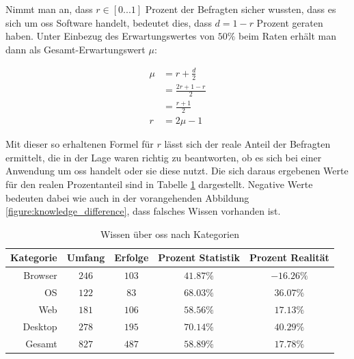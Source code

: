 \documentclass[a4paper]{article}
\begin{document}
                Nimmt man an, dass $r \in \left[0...1\right]$ Prozent der Befragten sicher wussten, dass es sich um \gls{oss} Software handelt, bedeutet dies, dass $d = 1 - r$ Prozent geraten haben. Unter Einbezug des Erwartungswertes von $50 \%$ beim Raten erhält man dann als Gesamt-Erwartungswert $\mu$:
            
                \begin{equation}
                \begin{split}
                    \mu &= r + \frac{d}{2} \\
                        &= \frac{2r + 1 - r}{2} \\
                        &= \frac{r + 1}{2} \\
                    r   &= 2\mu - 1
                \end{split}
                \end{equation}
            
                Mit dieser so erhaltenen Formel für $r$ lässt sich der reale Anteil der Befragten ermittelt, die in der Lage waren richtig zu beantworten, ob es sich bei einer Anwendung um \gls{oss} handelt oder sie diese nutzt. Die sich daraus ergebenen Werte für den realen Prozentanteil sind in Tabelle \ref{table:knowledge_by_category} dargestellt. Negative Werte bedeuten dabei wie auch in der vorangehenden Abbildung \ref{figure:knowledge_difference}, dass falsches Wissen vorhanden ist.
                
                
                \begin{table}
                    \centering
                    \begin{tabular}{rcccc}
                        Kategorie & Umfang & Erfolge & Prozent Statistik & Prozent Realität \\\hline\hline
                        Browser & $246$ & $103$ & $41.87\%$ & $-16.26\%$\\
                        OS & $122$ & $83$ & $68.03\%$ & $36.07\%$\\
                        Web & $181$ & $106$ & $58.56\%$ & $17.13\%$\\
                        Desktop & $278$ & $195$ & $70.14\%$ & $40.29\%$\\\hline
                        Gesamt & $827$ & $487$ & $58.89\%$ & $17.78\%$
                    \end{tabular}
                    \caption{Wissen über \gls{oss} nach Kategorien}
                    \label{table:knowledge_by_category}
                \end{table}
                
\end{document}
